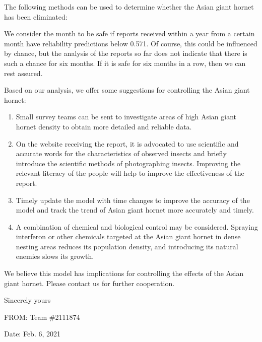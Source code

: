 \documentclass[13pt]{ctexart}
\begin{document}
The following methods can be used to determine whether the Asian giant hornet has been eliminated:

We consider the month to be safe if reports received within a year from a certain month have reliability predictions below 0.571.
Of course, this could be influenced by chance, but the analysis of the reports so far does not indicate that there is such a chance for six months.
If it is safe for six months in a row, then we can rest assured.

Based on our analysis, we offer some suggestions for controlling the Asian giant hornet:

\begin{enumerate}[1.]
	\item Small survey teams can be sent to investigate areas of high Asian giant hornet density to obtain more detailed and reliable data.
	
	\item On the website receiving the report, it is advocated to use scientific and accurate words for the characteristics of observed insects and briefly introduce the scientific methods of photographing insects. Improving the relevant literacy of the people will help to improve the effectiveness of the report.
	
	\item Timely update the model with time changes to improve the accuracy of the model and track the trend of Asian giant hornet more accurately and timely.
	
	\item A combination of chemical and biological control may be considered. Spraying interferon or other chemicals targeted at the Asian giant hornet in dense nesting areas reduces its population density, and introducing its natural enemies slows its growth.
\end{enumerate}

We believe this model has implications for controlling the effects of the Asian giant hornet. Please contact us for further cooperation.

\thispagestyle{empty}
\vspace{8.5pt}
{\raggedright
Sincerely yours	\par
FROM: Team \#2111874 \par
Date: Feb. 6, 2021 \par
}

\newpage
\thispagestyle{empty}
\tableofcontents
\newpage
\setcounter{page}{1}
\end{document}
